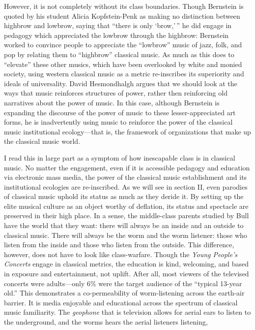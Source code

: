 \documentclass[12pt,letterpaper]{article}
\begin{document}
	However, it is not completely without its class boundaries.
	Though Bernstein is quoted by
	his student Alicia Kopfstein-Penk as making no distinction between
	highbrow and lowbrow, saying that ``there is only 
	`brow,'\,''\autocite[xvi]{Kopfstein}  he did engage in pedagogy which
	appreciated the lowbrow through the highbrow: Bernstein worked to
	convince people to appreciate the ``lowbrow'' music of jazz, folk, and
	pop by relating them to ``highbrow'' classical 
	music.\autocite[63]{Kopfstein} As much as this does to ``elevate''
	these other musics, which have been overlooked by white and monied 
	society, using western classical music as a metric re-inscribes its
	superiority and ideals of universality.  
	David Hesmondhalgh argues that we should look at the ways that
	music reinforces structures of power, rather then reinforcing old 
	narratives about the power of music.\autocite[xiii]{Kopfstein} 
	In this case, although Bernstein is expanding the discourse of the power
	of music to these lesser-appreciated art forms, he is inadvertently using
	music to reinforce the power of the classical music institutional 
	ecology---that is, the framework of organizations that make up the 
	classical music world.\autocite[27]{Bull}  

	I read this in large part as a symptom of how inescapable class is in 
	classical music. No matter the engagement, even if it is accessible 
	pedagogy and education via electronic mass media, the power of the 
	classical music
	establishment and its institutional ecologies are re-inscribed. As
	we will see in section II, even parodies of classical music 
	uphold its status as much as they deride it. By 
	setting up the elite musical culture as an object worthy of deflation,
	its status and spectacle are preserved in their high 
	place.\autocite[252]{Garrett} In a sense, the middle-class parents 
	studied by Bull have the world that they want: there will always be
	an inside and an outside to classical music. There will always be the
	worm and the worm listener: those who listen from the inside and those
	who listen from
	the outside. This difference, however, does not have to look like
	class-warfare. Though the \textit{Young People's Concerts} engage in 
	classical metrics, the education is kind, welcoming, and 
	based in exposure and entertainment, not uplift. After all, most viewers
	of the televised concerts were adults---only 6\% were the
	target audience of the ``typical 13-year old.''\autocite[2]{Kopfstein}    
	This demonstrates a co-permeability of worm-listening across the
	earth-air barrier. It is media enjoyable and educational across the
	spectrum of classical music familiarity. The \textit{geophone} that is
	television allows for aerial ears to listen to the underground, and the
	worms hears the aerial listeners listening,    
\end{document}
